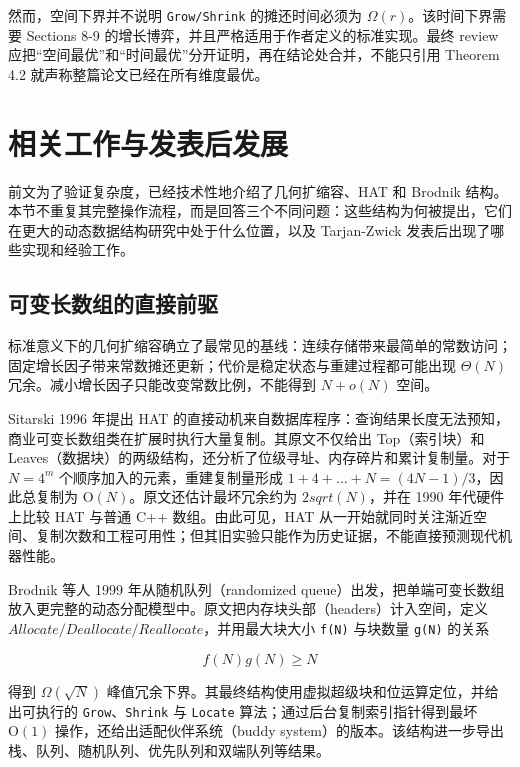 \documentclass[UTF8,11pt,a4paper]{ctexart}
\begin{document}
然而，空间下界并不说明 \textnormal{\texttt{Grow/Shrink}} 的摊还时间必须为 $\Omega(r)$。该时间下界需要 Sections 8-9 的增长博弈，并且严格适用于作者定义的标准实现。最终 review 应把“空间最优”和“时间最优”分开证明，再在结论处合并，不能只引用 Theorem 4.2 就声称整篇论文已经在所有维度最优。\par

\section{相关工作与发表后发展}

前文为了验证复杂度，已经技术性地介绍了几何扩缩容、HAT 和 Brodnik 结构。本节不重复其完整操作流程，而是回答三个不同问题：这些结构为何被提出，它们在更大的动态数据结构研究中处于什么位置，以及 Tarjan-Zwick 发表后出现了哪些实现和经验工作。\par

\subsection{可变长数组的直接前驱}

标准意义下的几何扩缩容确立了最常见的基线：连续存储带来最简单的常数访问；固定增长因子带来常数摊还更新；代价是稳定状态与重建过程都可能出现 $\Theta(N)$ 冗余。减小增长因子只能改变常数比例，不能得到 $N+o(N)$ 空间。\par

Sitarski 1996 年提出 HAT 的直接动机来自数据库程序：查询结果长度无法预知，商业可变长数组类在扩展时执行大量复制。其原文不仅给出 Top（索引块）和 Leaves（数据块）的两级结构，还分析了位级寻址、内存碎片和累计复制量。对于 $N=4^m$ 个顺序加入的元素，重建复制量形成 $1+4+\ldots+N=(4N-1)/3$，因此总复制为 $\mathrm{O}(N)$。原文还估计最坏冗余约为 $2sqrt(N)$，并在 1990 年代硬件上比较 HAT 与普通 C++ 数组。由此可见，HAT 从一开始就同时关注渐近空间、复制次数和工程可用性；但其旧实验只能作为历史证据，不能直接预测现代机器性能。\par

Brodnik 等人 1999 年从随机队列（randomized queue）出发，把单端可变长数组放入更完整的动态分配模型中。原文把内存块头部（headers）计入空间，定义 $Allocate/Deallocate/Reallocate$，并用最大块大小 \textnormal{\texttt{f(N)}} 与块数量 \textnormal{\texttt{g(N)}} 的关系\par

\[
  f(N)g(N) \geq  N
\]

得到 $\Omega(\sqrt{N})$ 峰值冗余下界。其最终结构使用虚拟超级块和位运算定位，并给出可执行的 \textnormal{\texttt{Grow}}、\textnormal{\texttt{Shrink}} 与 \textnormal{\texttt{Locate}} 算法；通过后台复制索引指针得到最坏 $\mathrm{O}(1)$ 操作，还给出适配伙伴系统（buddy system）的版本。该结构进一步导出栈、队列、随机队列、优先队列和双端队列等结果。\par
\end{document}
